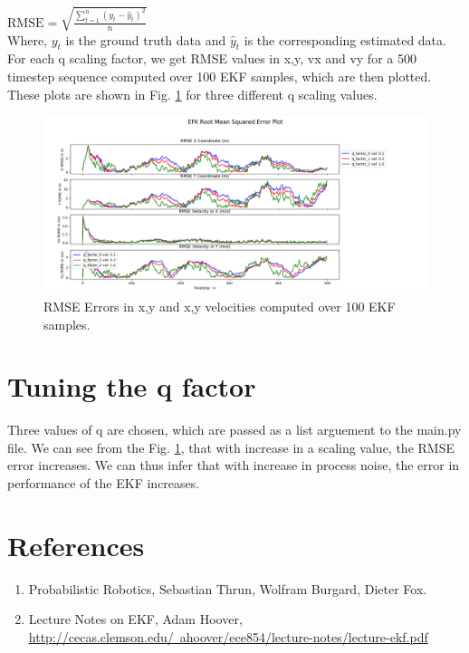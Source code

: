 \documentclass[12pt]{article}
\begin{document}
$\mathrm{RMSE} = \sqrt{\frac{\sum_{t=1}^{n}{(y_t - \hat{y}_t)^2}}{n}}$\\

Where, $y_{t}$ is the ground truth data and $\hat{y}_{t}$ is the corresponding estimated data.\\

For each q scaling factor, we get RMSE values in x,y, vx and vy  for a 500 timestep sequence computed over 100 EKF samples, which are  then plotted. These plots are shown in  Fig. \ref{fig:EKF_results} for three different q scaling values. 

\begin{figure}[!th]
\centering
\includegraphics[width=\textwidth]{../results/EKF_results_main.png}
\caption{RMSE Errors in x,y and x,y velocities computed over 100 EKF samples.}
\label{fig:EKF_results}
\end{figure}



\section{Tuning the q factor}
Three values of q are chosen, which are passed as a list arguement to the main.py file. We can see from the Fig. \ref{fig:EKF_results}, that with increase in a scaling value, the RMSE error increases. We can thus infer that with increase in process noise, the error in performance of the EKF increases.


\section{References}
\begin{enumerate}
  \item Probabilistic Robotics, Sebastian Thrun, Wolfram Burgard, Dieter Fox.
  \item Lecture Notes on EKF, Adam Hoover,
\href{http://cecas.clemson.edu/~ahoover/ece854/lecture-notes/lecture-ekf.pdf}{\color{blue}http://cecas.clemson.edu/~ahoover/ece854/lecture-notes/lecture-ekf.pdf}  
\end{enumerate}
\end{document}

